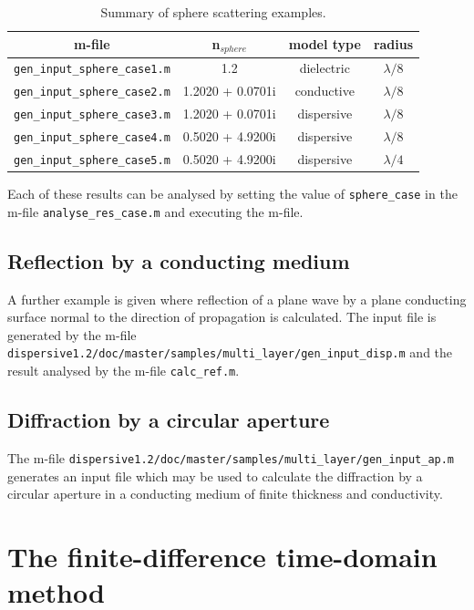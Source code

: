 \documentclass[a4paper, 12pt]{article}
\begin{document}
	\begin{table}[!h]
		\begin{center}
			\begin{tabular}{|c|c|c|c|}
				\hline
				m-file&n$_{sphere}$&model type&radius\\
				\hline
				\verb+gen_input_sphere_case1.m+&1.2&dielectric&$\lambda/8$\\
				\hline
				\verb+gen_input_sphere_case2.m+&1.2020 + 0.0701i&conductive&$\lambda/8$\\
				\hline
				\verb+gen_input_sphere_case3.m+&1.2020 + 0.0701i&dispersive&$\lambda/8$\\
				\hline
				\verb+gen_input_sphere_case4.m+&0.5020 + 4.9200i&dispersive&$\lambda/8$\\
				\hline
				\verb+gen_input_sphere_case5.m+&0.5020 + 4.9200i&dispersive&$\lambda/4$\\
				\hline
			\end{tabular}
		\end{center}
		\caption{Summary of sphere scattering examples.}
		\label{tab:examples}
	\end{table}

	Each of these results can be analysed by setting the value of
	\verb+sphere_case+ in the m-file \verb+analyse_res_case.m+ and
	executing the m-file.
	\subsection{Reflection by a conducting medium}
	A further example is given where reflection of a plane wave by a plane
	conducting surface normal to the direction of propagation is
	calculated. The input file is generated by the m-file
	\newline\verb+dispersive1.2/doc/master/samples/multi_layer/gen_input_disp.m+
	and the result analysed by the m-file \verb+calc_ref.m+.

	\subsection{Diffraction by a circular aperture}
	The m-file
	\newline\verb+dispersive1.2/doc/master/samples/multi_layer/gen_input_ap.m+
	generates an input file which may be used to calculate the diffraction
	by a circular aperture in a conducting medium of finite thickness and conductivity.

	
	\clearpage

	\appendix
	\section{The finite-difference time-domain method}
\end{document}
